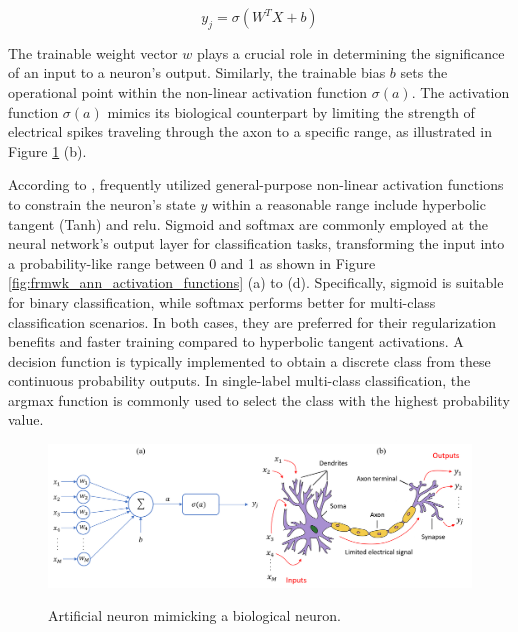 \begin{equation}
    \label{eq:ann_activation_outpu}
    y_j = \sigma  \left( W^TX +b \right)
\end{equation}

The trainable weight vector $w$ plays a crucial role in determining the significance of an input to a neuron's output. Similarly, the trainable bias $b$ sets the operational point within the non-linear activation function $\sigma(a)$. The activation function $\sigma(a)$ mimics its biological counterpart by limiting the strength of electrical spikes traveling through the axon to a specific range, as illustrated in Figure \ref{fig:frmwk_ann_artificial_neuron} (b).

According to \textcite{Bishop2023}, frequently utilized general-purpose non-linear activation functions to constrain the neuron's state $y$ within a reasonable range include hyperbolic tangent (Tanh) and \gls{relu}. Sigmoid and softmax are commonly employed at the neural network's output layer for classification tasks, transforming the input into a probability-like range between 0 and 1 as shown in Figure \ref{fig:frmwk_ann_activation_functions} (a) to (d). Specifically, sigmoid is suitable for binary classification, while softmax performs better for multi-class classification scenarios. In both cases, they are preferred for their regularization benefits and faster training compared to hyperbolic tangent activations. A decision function is typically implemented to obtain a discrete class from these continuous probability outputs. In single-label multi-class classification, the argmax function is commonly used to select the class with the highest probability value. 

\begin{figure}[htbp]
    \raggedright
        \caption{Artificial neuron mimicking a biological neuron.}
        \includegraphics[width=1\textwidth]{resources/images/030-theoretical_framework/Framework_ann_neuron.png}
        \label{fig:frmwk_ann_artificial_neuron}
\end{figure}

